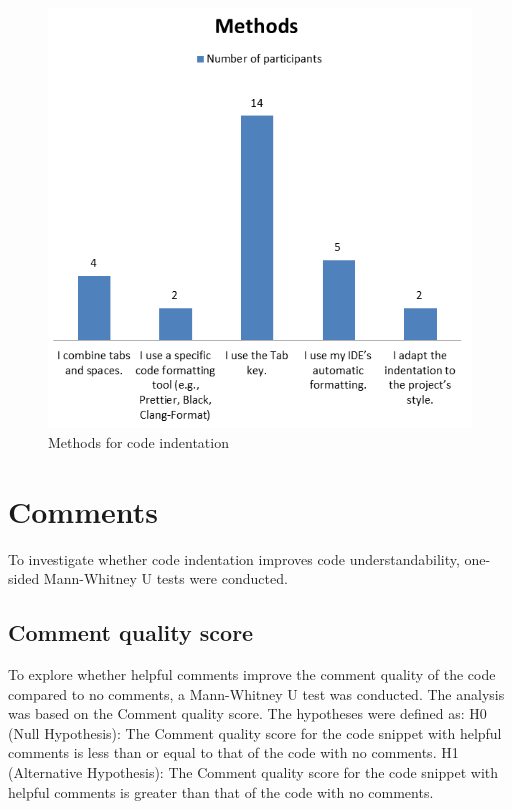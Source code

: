 \begin{figure} [H]
  \centering
  \includegraphics[scale=0.9]{figures/inM.png}
  \caption{Methods for code indentation}
  \label{fig:AnhangsChor}
\end{figure}



\section{Comments}


To investigate whether code indentation improves code understandability, one-sided Mann-Whitney U tests were conducted. 

\subsection{Comment quality score}

To explore whether helpful comments improve the comment quality of the code compared to no comments, a Mann-Whitney U test was conducted.  The analysis was based on the Comment quality score. The hypotheses were defined as: H0 (Null Hypothesis): The Comment quality score for the code snippet with helpful comments is less than or equal to that of the code with no comments.  H1 (Alternative Hypothesis): The Comment quality score for the code snippet with helpful comments is greater than that of the code with no comments.

